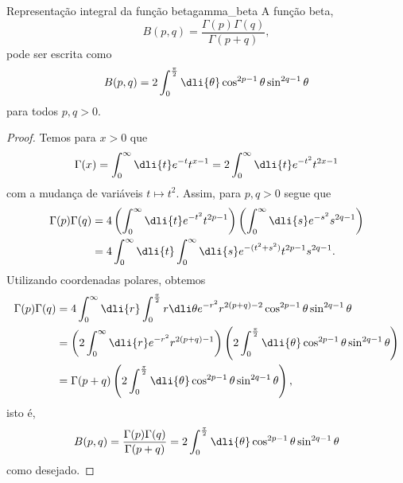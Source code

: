 \begin{lemma}{Representação integral da função beta}{gamma_beta}
    A função beta,
    \begin{equation*}
        B(p,q) = \frac{\Gamma(p) \Gamma(q)}{\Gamma(p + q)},
    \end{equation*}
    pode ser escrita como
    \begin{equation*}
        B(p,q) = 2\int_0^{\frac{\pi}{2}} \dli{\theta} \cos^{2p - 1}\theta \sin^{2q - 1}\theta
    \end{equation*}
    para todos \(p, q > 0\).
\end{lemma}
\begin{proof}
    Temos para \(x > 0\) que
    \begin{equation*}
        \Gamma(x) = \int_0^\infty \dli{t} e^{-t} t^{x - 1} = 2 \int_0^\infty \dli{t} e^{-t^2}t^{2x - 1}
    \end{equation*}
    com a mudança de variáveis \(t \mapsto t^2\). Assim, para \(p, q > 0\) segue que
    \begin{align*}
        \Gamma(p)\Gamma(q) &= 4 \left(\int_0^\infty\dli{t} e^{-t^2} t^{2p - 1}\right)\left(\int_0^\infty\dli{s} e^{-s^2} s^{2q - 1}\right)\\
                           &= 4 \int_0^\infty \dli{t} \int_0^\infty \dli{s} e^{-(t^2 + s^2)} t^{2p - 1} s^{2q - 1}.
    \end{align*}
    Utilizando coordenadas polares, obtemos
    \begin{align*}
        \Gamma(p)\Gamma(q) &= 4 \int_0^\infty \dli{r} \int_0^{\frac{\pi}{2}} r\dli\theta e^{-r^2}r^{2(p+q) - 2} \cos^{2p - 1}\theta \sin^{2q-1}\theta\\
                           &= \left(2 \int_0^{\infty}\dli{r} e^{-r^2}r^{2(p+q)-1}\right)\left(2 \int_0^{\frac{\pi}{2}}\dli{\theta} \cos^{2p - 1}\theta \sin^{2q - 1}\theta\right)\\
                           &= \Gamma(p + q) \left(2 \int_0^{\frac{\pi}{2}}\dli{\theta} \cos^{2p - 1}\theta \sin^{2q - 1}\theta\right),
    \end{align*}
    isto é,
    \begin{equation*}
        B(p,q) = \frac{\Gamma(p)\Gamma(q)}{\Gamma(p+q)} = 2 \int_0^{\frac{\pi}{2}}\dli{\theta} \cos^{2p - 1}\theta \sin^{2q - 1}\theta
    \end{equation*}
    como desejado.
\end{proof}
